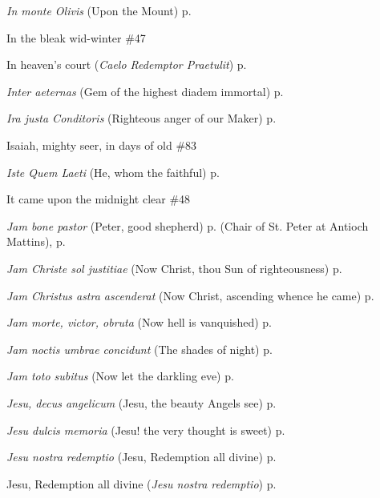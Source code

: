 \begin{hangparas}{1.25em}{1}
\textit{In monte Olivis} (Upon the Mount) \dotfill p. \pageref{HolyRosaryInvitatory}
\par\noindent
In the bleak wid-winter \dotfill \#47
\par\noindent
In heaven's court (\textit{Caelo Redemptor Praetulit}) \dotfill p. \pageref{MotherhoodInvitatory}
\par\noindent
\textit{Inter aeternas} (Gem of the highest diadem immortal) \dotfill p. \pageref{BenedictMattins}
\par\noindent
\textit{Ira justa Conditoris} (Righteous anger of our Maker) \dotfill p. \pageref{PreciousBloodInvitatory}
\par\noindent
Isaiah, mighty seer, in days of old \dotfill \#83
\par\noindent
\textit{Iste Quem Laeti} (He, whom the faithful) \dotfill p. \pageref{JosephMattins}
\par\noindent
It came upon the midnight clear \dotfill \#48
\par\noindent
\textit{Jam bone pastor} (Peter, good shepherd) \dotfill p. \pageref{PeterAntiochMattins} (Chair of St. Peter at Antioch Mattins), p. \pageref{PeterMattins}
\par\noindent
\textit{Jam Christe sol justitiae} (Now Christ, thou Sun of righteousness) \dotfill p. \pageref{FirstLentMattins}
\par\noindent
\textit{Jam Christus astra ascenderat} (Now Christ, ascending whence he came) \dotfill p. \pageref{WhitsundayInvitatory}
\par\noindent
\textit{Jam morte, victor, obruta} (Now hell is vanquished) \dotfill p. \pageref{HolyRosaryMattins}
\par\noindent
\textit{Jam noctis umbrae concidunt} (The shades of night) \dotfill p. \pageref{ScholasticaMattins}
\par\noindent
\textit{Jam toto subitus} (Now let the darkling eve) \dotfill p. \pageref{SevenSorrowsEvensong}
\par\noindent
\textit{Jesu, decus angelicum} (Jesu, the beauty Angels see) \dotfill p. \pageref{HolyNameMattins}
\par\noindent
\textit{Jesu dulcis memoria} (Jesu! the very thought is sweet) \dotfill p. \pageref{HolyNameEvensong}
\par\noindent
\textit{Jesu nostra redemptio} (Jesu, Redemption all divine) \dotfill p. \pageref{AscensionMattins}
\par\noindent
Jesu, Redemption all divine (\textit{Jesu nostra redemptio}) \dotfill p. \pageref{AscensionMattins}

\end{hangparas}
